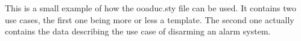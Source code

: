 \documentclass[a4paper, 10pt, oneside]{article}
\begin{document}
This is a small example of how the ooaduc.sty file can be used. It contains 
two use cases, the first one being more or less a template. The second one actually contains the data describing the use case of disarming an alarm system.

\listofusecase




\appendix
\listofIssues
\printindex
\end{document}
